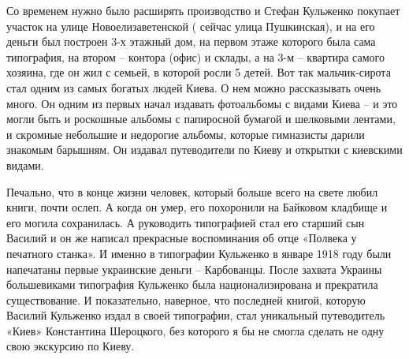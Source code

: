 Со временем нужно было расширять производство и Стефан Кульженко покупает
участок на улице Новоелизаветенской ( сейчас улица Пушкинская),  и на его
деньги был построен 3-х этажный дом, на первом этаже которого была сама
типография, на втором – контора (офис) и склады, а на 3-м – квартира самого
хозяина, где он жил с семьей, в которой росли 5 детей. Вот так мальчик-сирота
стал одним из самых богатых людей Киева. О нем можно рассказывать очень много.
Он одним из первых начал издавать фотоальбомы с видами Киева – и это могли быть
и роскошные альбомы с папиросной бумагой и шелковыми лентами, и скромные
небольшие и недорогие альбомы, которые гимназисты дарили знакомым барышням. Он
издавал путеводители по Киеву и открытки с киевскими видами.

Печально, что в конце жизни человек, который больше всего на свете любил книги,
почти ослеп. А когда он умер, его похоронили на Байковом кладбище и его могила
сохранилась. А руководить типографией стал его старший сын Василий и он же
написал прекрасные воспоминания об отце «Полвека у печатного станка». И именно
в типографии Кульженко в январе 1918 году были напечатаны первые украинские
деньги – Карбованцы. После захвата Украины большевиками типография  Кульженко
была национализирована и прекратила существование. И показательно, наверное,
что последней книгой, которую Василий Кульженко издал в своей типографии, стал
уникальный путеводитель «Киев» Константина Шероцкого, без которого я бы не
смогла сделать не одну свою экскурсию по Киеву.
